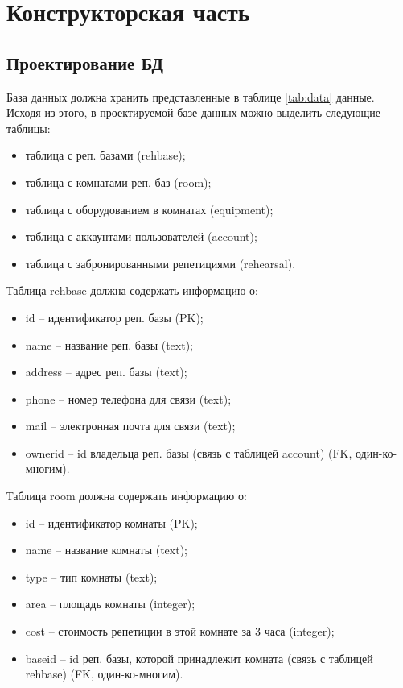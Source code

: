 \section{Конструкторская часть}

\subsection{Проектирование БД}

База данных должна хранить представленные в таблице \ref{tab:data} данные. Исходя из этого, в проектируемой базе данных можно выделить следующие таблицы:
\begin{itemize}
	\item таблица с реп. базами (rehbase);
	\item таблица с комнатами реп. баз (room);
	\item таблица с оборудованием в комнатах (equipment);
	\item таблица с аккаунтами пользователей (account);
	\item таблица с забронированными репетициями (rehearsal).
\end{itemize}

Таблица rehbase должна содержать информацию о:
\begin{itemize}
	\item id – идентификатор реп. базы (PK);
	\item name – название реп. базы (text);
	\item address – адрес реп. базы (text);
	\item phone – номер телефона для связи (text);
	\item mail – электронная почта для связи (text);
	\item ownerid – id владельца реп. базы (связь с таблицей account) (FK, один-ко-многим).
\end{itemize}

Таблица room должна содержать информацию о:
\begin{itemize}
	\item id – идентификатор комнаты (PK);
	\item name – название комнаты (text);
	\item type – тип комнаты (text);
	\item area – площадь комнаты (integer);
	\item cost – стоимость репетиции в этой комнате за 3 часа (integer);
	\item baseid – id реп. базы, которой принадлежит комната (связь с таблицей rehbase) (FK, один-ко-многим).
\end{itemize}

